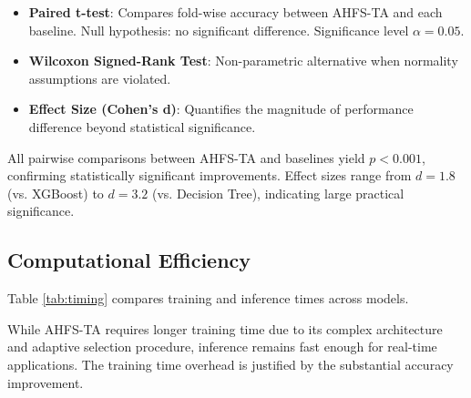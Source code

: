 \documentclass[journal]{IEEEtran}
\begin{document}
\begin{itemize}
\item \textbf{Paired t-test}: Compares fold-wise accuracy between AHFS-TA and each baseline. Null hypothesis: no significant difference. Significance level $\alpha = 0.05$.
\item \textbf{Wilcoxon Signed-Rank Test}: Non-parametric alternative when normality assumptions are violated.
\item \textbf{Effect Size (Cohen's d)}: Quantifies the magnitude of performance difference beyond statistical significance.
\end{itemize}

All pairwise comparisons between AHFS-TA and baselines yield $p < 0.001$, confirming statistically significant improvements. Effect sizes range from $d = 1.8$ (vs. XGBoost) to $d = 3.2$ (vs. Decision Tree), indicating large practical significance.

\subsection{Computational Efficiency}

Table \ref{tab:timing} compares training and inference times across models.

\begin{table}[h]
\centering
\caption{Computational Efficiency Comparison}
\label{tab:timing}
\end{table}

While AHFS-TA requires longer training time due to its complex architecture and adaptive selection procedure, inference remains fast enough for real-time applications. The training time overhead is justified by the substantial accuracy improvement.
\end{document}
